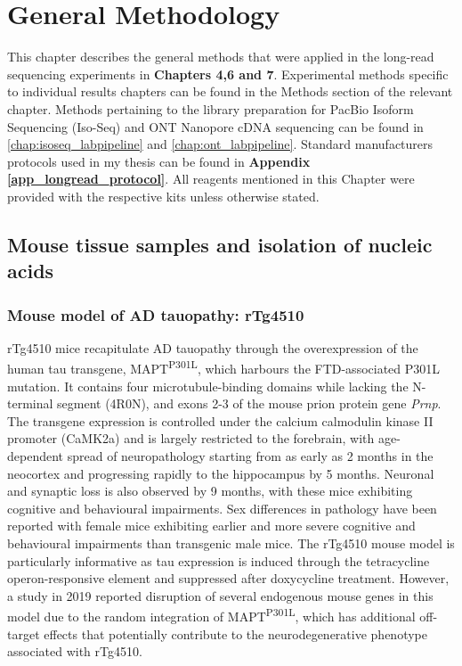 \chapter{General Methodology}\label{ch: general methodology}

This chapter describes the general methods that were applied in the long-read sequencing experiments in \textbf{Chapters 4,6 and 7}. Experimental methods specific to individual results chapters can be found in the Methods section of the relevant chapter. Methods pertaining to the library preparation for PacBio Isoform Sequencing (Iso-Seq) and ONT Nanopore cDNA sequencing can be found in \cref{chap:isoseq_labpipeline} and \cref{chap:ont_labpipeline}. Standard manufacturers protocols used in my thesis can be found in \textbf{Appendix \ref{app_longread_protocol}}. All reagents mentioned in this Chapter were provided with the respective kits unless otherwise stated.

\section{Mouse tissue samples and isolation of nucleic acids}

\subsection{Mouse model of AD tauopathy: rTg4510} 
rTg4510 mice recapitulate AD tauopathy through the overexpression of the human tau transgene, MAPT\textsuperscript{P301L}, which harbours the FTD-associated P301L mutation. It contains four microtubule-binding domains while lacking the N-terminal segment (4R0N), and exons 2-3 of the mouse prion protein gene \textit{Prnp}. The transgene expression is controlled under the calcium calmodulin kinase II promoter (CaMK2a) and is largely restricted to the forebrain, with age-dependent spread of neuropathology starting from as early as 2 months in the neocortex and progressing rapidly to the hippocampus by 5 months. Neuronal and synaptic loss is also observed by 9 months, with these mice exhibiting cognitive and behavioural impairments. Sex differences in pathology have been reported with female mice exhibiting earlier and more severe cognitive and behavioural impairments than transgenic male mice\cite{M2011}. The rTg4510 mouse model is particularly informative as tau expression is induced through the tetracycline operon-responsive element and suppressed after doxycycline treatment\cite{Ramsden2005}. However, a study in 2019 reported disruption of several endogenous mouse genes in this model due to the random integration of MAPT\textsuperscript{P301L}, which has additional off-target effects that potentially contribute to the neurodegenerative phenotype associated with rTg4510\cite{Gamache2019}. 
 

